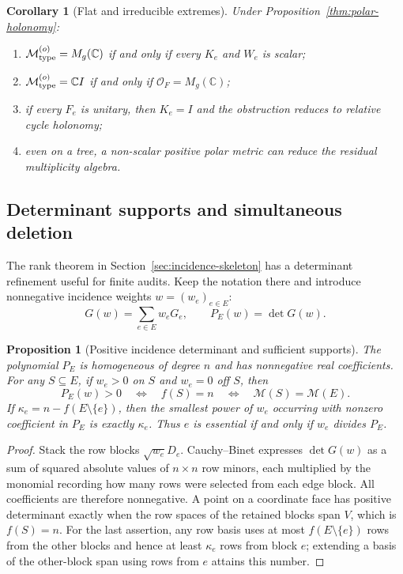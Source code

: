 \documentclass[11pt]{article}
\numberwithin{equation}{section}
\newtheorem{proposition}[theorem]{Proposition}
\newtheorem{corollary}[theorem]{Corollary}
\theoremstyle{definition}
\theoremstyle{remark}
\newcommand{\C}{\mathbb C}
\newcommand{\M}{\mathcal M}
\newcommand{\Oalg}{\mathcal O}
\begin{document}
\begin{corollary}[Flat and irreducible extremes]
\label{cor:polar-extremes}
Under Proposition~\ref{thm:polar-holonomy}:
\begin{enumerate}[label=\textup{(\roman*)},leftmargin=2.8em]
\item $\M_{\rm type}^{(o)}=M_g(\C)$ if and only if every $K_e$ and $W_e$ is
      scalar;
\item $\M_{\rm type}^{(o)}=\C I$ if and only if $\Oalg_F=M_g(\C)$;
\item if every $F_e$ is unitary, then $K_e=I$ and the obstruction reduces to
      relative cycle holonomy;
\item even on a tree, a non-scalar positive polar metric can reduce the
      residual multiplicity algebra.
\end{enumerate}
\end{corollary}


\subsection{Determinant supports and simultaneous deletion}
\label{app:incidence-details}

The rank theorem in Section~\ref{sec:incidence-skeleton} has a determinant
refinement useful for finite audits.  Keep the notation there and introduce
nonnegative incidence weights $w=(w_e)_{e\in E}$:
\begin{equation}
 G(w)=\sum_{e\in E}w_eG_e,
 \qquad P_E(w)=\det G(w).
 \label{eq:weighted-incidence-Gram}
\end{equation}

\begin{proposition}[Positive incidence determinant and sufficient supports]
\label{thm:incidence-determinant}
The polynomial $P_E$ is homogeneous of degree $n$ and has nonnegative real
coefficients.  For any $S\subseteq E$, if $w_e>0$ on $S$ and $w_e=0$ off
$S$, then
\begin{equation}
 P_E(w)>0\quad\Longleftrightarrow\quad f(S)=n
 \quad\Longleftrightarrow\quad \M(S)=\M(E).
 \label{eq:incidence-face-exactness}
\end{equation}
If
$\kappa_e=n-f(E\setminus\{e\})$, then the smallest power of $w_e$ occurring
with nonzero coefficient in $P_E$ is exactly $\kappa_e$.  Thus $e$ is
essential if and only if $w_e$ divides $P_E$.
\end{proposition}

\begin{proof}
Stack the row blocks $\sqrt{w_e}D_e$.  Cauchy--Binet expresses
$\det G(w)$ as a sum of squared absolute values of $n\times n$ row minors,
each multiplied by the monomial recording how many rows were selected from
each edge block.  All coefficients are therefore nonnegative.  A point on a
coordinate face has positive determinant exactly when the row spaces of the
retained blocks span $V$, which is $f(S)=n$.  For the last assertion, any row
basis uses at most $f(E\setminus\{e\})$ rows from the other blocks and hence
at least $\kappa_e$ rows from block $e$; extending a basis of the other-block
span using rows from $e$ attains this number.
\end{proof}
\end{document}
